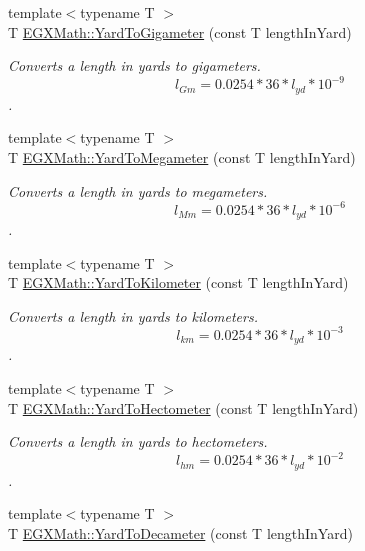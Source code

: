 \begin{DoxyCompactItemize}
{\footnotesize template$<$typename T $>$ }\\T \mbox{\hyperlink{group___e_g_x_math-_conversions-_length_conversions-_imperial-_yard-_s_i_gad6931b2e09213f4f3ceee9c5cc6a4b44}{E\+G\+X\+Math\+::\+Yard\+To\+Gigameter}} (const T length\+In\+Yard)
\begin{DoxyCompactList}\small\item\em Converts a length in yards to gigameters. \[ l_{Gm}=0.0254 * 36 * l_{yd} * 10^{-9} \]. \end{DoxyCompactList}\item 
{\footnotesize template$<$typename T $>$ }\\T \mbox{\hyperlink{group___e_g_x_math-_conversions-_length_conversions-_imperial-_yard-_s_i_ga423d6a2f1a68d54370f3c9967e6c877e}{E\+G\+X\+Math\+::\+Yard\+To\+Megameter}} (const T length\+In\+Yard)
\begin{DoxyCompactList}\small\item\em Converts a length in yards to megameters. \[ l_{Mm}=0.0254 * 36 * l_{yd} * 10^{-6} \]. \end{DoxyCompactList}\item 
{\footnotesize template$<$typename T $>$ }\\T \mbox{\hyperlink{group___e_g_x_math-_conversions-_length_conversions-_imperial-_yard-_s_i_ga035659a5d1e693eaeda9b012fe59a44f}{E\+G\+X\+Math\+::\+Yard\+To\+Kilometer}} (const T length\+In\+Yard)
\begin{DoxyCompactList}\small\item\em Converts a length in yards to kilometers. \[ l_{km}=0.0254 * 36 * l_{yd} * 10^{-3} \]. \end{DoxyCompactList}\item 
{\footnotesize template$<$typename T $>$ }\\T \mbox{\hyperlink{group___e_g_x_math-_conversions-_length_conversions-_imperial-_yard-_s_i_ga7aa38196844c4bec3698c86ce582af65}{E\+G\+X\+Math\+::\+Yard\+To\+Hectometer}} (const T length\+In\+Yard)
\begin{DoxyCompactList}\small\item\em Converts a length in yards to hectometers. \[ l_{hm}=0.0254 * 36 * l_{yd} * 10^{-2} \]. \end{DoxyCompactList}\item 
{\footnotesize template$<$typename T $>$ }\\T \mbox{\hyperlink{group___e_g_x_math-_conversions-_length_conversions-_imperial-_yard-_s_i_gafcf72603effbca33bde09d34475d88b4}{E\+G\+X\+Math\+::\+Yard\+To\+Decameter}} (const T length\+In\+Yard)

\end{DoxyCompactItemize}
